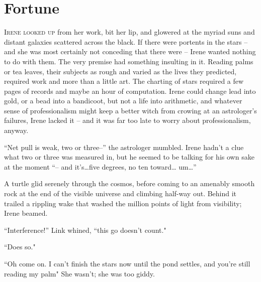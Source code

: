 \documentclass[../FGP.tex]{subfiles}
\def\setmarginpargeometry{%
  \newgeometry{textwidth=260pt,marginparwidth=150pt}
  \edef\marginnotetextwidth{\the\textwidth}}
\begin{document}
\setmarginpargeometry
\section{Fortune}
\begin{quote}\end{quote}
\noindent \label{sec:fortune}\lettrine[lines=3,loversize=0.039]{I}{rene looked up}%
from her work, bit her lip, and glowered at the myriad suns and distant galaxies scattered across the black. If there were portents in the stars -- and she was most certainly not conceding that there were -- Irene wanted nothing to do with them. The very premise had something insulting in it. Reading palms or tea leaves, their subjects as rough and varied as the lives they predicted, required work and more than a little art. The charting of stars required a few pages of records and maybe an hour of computation. Irene could change lead into gold, or a bead into a bandicoot, but not a life into arithmetic, and whatever sense of professionalism might keep a better witch from crowing at an astrologer's failures, Irene lacked it -- and it was far too late to worry about professionalism, anyway.

``Net pull is weak, two or three--'' the astrologer mumbled. Irene hadn't a clue what two or three was measured in, but he seemed to be talking for his own sake at the moment ``-- and it's\ldots five degrees, no ten toward{\ldots} um{\ldots}''

A turtle glid serenely through the cosmos, before coming to an amenably smooth rock at the end of the visible universe and climbing half-way out. Behind it trailed a rippling wake that washed the million points of light from visibility; Irene beamed.

\normalmarginpar``Interference!'' Link whined, ``this go doesn't count."  

``Does so." 

``Oh come on. I can't finish the stars now until the pond settles, and you're still reading my palm" She wasn't; she was too giddy.
\end{document}
